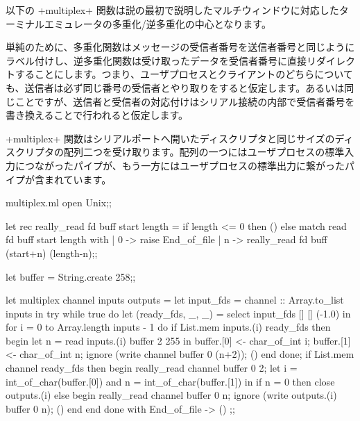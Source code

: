 \begin{example}
以下の \ml+multiplex+ 関数は説の最初で説明したマルチウィンドウに対応したターミナルエミュレータの多重化/逆多重化の中心となります。

単純のために、多重化関数はメッセージの受信者番号を送信者番号と同じようにラベル付けし、逆多重化関数は受け取ったデータを受信者番号に直接リダイレクトすることにします。つまり、ユーザプロセスとクライアントのどちらについても、送信者は必ず同じ番号の受信者とやり取りをすると仮定します。あるいは同じことですが、送信者と受信者の対応付けはシリアル接続の内部で受信者番号を書き換えることで行われると仮定します。

\ml+multiplex+ 関数はシリアルポートへ開いたディスクリプタと同じサイズのディスクリプタの配列二つを受け取ります。配列の一つにはユーザプロセスの標準入力につながったパイプが、もう一方にはユーザプロセスの標準出力に繋がったパイプが含まれています。
%
\begin{listingcodefile}{multiplex.ml}
open Unix;;

let rec really_read fd buff start length =
  if length <= 0 then () else
    match read fd buff start length with
    | 0 -> raise End_of_file
    | n -> really_read fd buff (start+n) (length-n);;

let buffer = String.create 258;;

let multiplex channel inputs outputs =
  let input_fds = channel :: Array.to_list inputs in
  try
    while true do
      let (ready_fds, _, _) = select input_fds [] [] (-1.0) in
      for i = 0 to Array.length inputs - 1 do
        if List.mem inputs.(i) ready_fds then begin
          let n = read inputs.(i) buffer 2 255 in
          buffer.[0] <- char_of_int i;
          buffer.[1] <- char_of_int n;
          ignore (write channel buffer 0 (n+2));
          ()
        end
      done;
      if List.mem channel ready_fds then begin
        really_read channel buffer 0 2;
        let i = int_of_char(buffer.[0])
        and n = int_of_char(buffer.[1]) in
        if n = 0 then close outputs.(i) else
        begin
          really_read channel buffer 0 n;
          ignore (write outputs.(i) buffer 0 n);
          ()
        end
      end
    done
  with End_of_file -> () ;;
\end{listingcodefile}


\end{example}

